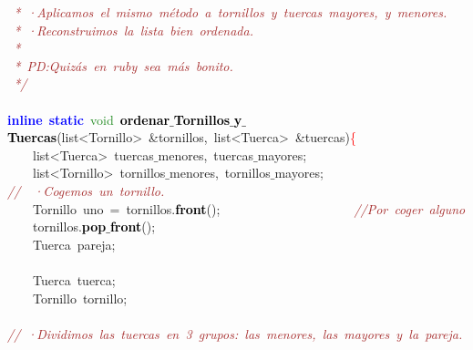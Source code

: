 \mbox{}\textit{\textcolor{Brown}{\ *\ ·Aplicamos\ el\ mismo\ método\ a\ tornillos\ y\ tuercas\ mayores,\ y\ menores.}} \\
\mbox{}\textit{\textcolor{Brown}{\ *\ ·Reconstruimos\ la\ lista\ bien\ ordenada.}} \\
\mbox{}\textit{\textcolor{Brown}{\ *}} \\
\mbox{}\textit{\textcolor{Brown}{\ *\ PD:Quizás\ en\ ruby\ sea\ más\ bonito.}} \\
\mbox{}\textit{\textcolor{Brown}{\ */}} \\
\mbox{} \\
\mbox{}\textbf{\textcolor{Blue}{inline}}\ \textbf{\textcolor{Blue}{static}}\ \textcolor{ForestGreen}{void}\ \textbf{\textcolor{Black}{ordenar$\_$Tornillos$\_$y$\_$Tuercas}}\textcolor{BrickRed}{(}\textcolor{TealBlue}{list\textless{}Tornillo\textgreater{}\ \&tornillos,\ list\textless{}Tuerca\textgreater{}}\ \textcolor{BrickRed}{\&}tuercas\textcolor{BrickRed}{)}\textcolor{Red}{\{} \\
\mbox{}\ \ \ \ \textcolor{TealBlue}{list\textless{}Tuerca\textgreater{}}\ tuercas$\_$menores\textcolor{BrickRed}{,}\ tuercas$\_$mayores\textcolor{BrickRed}{;} \\
\mbox{}\ \ \ \ \textcolor{TealBlue}{list\textless{}Tornillo\textgreater{}}\ tornillos$\_$menores\textcolor{BrickRed}{,}\ tornillos$\_$mayores\textcolor{BrickRed}{;} \\
\mbox{}\textit{\textcolor{Brown}{//\ \ ·Cogemos\ un\ tornillo.}} \\
\mbox{}\ \ \ \ \textcolor{TealBlue}{Tornillo}\ uno\ \textcolor{BrickRed}{=}\ tornillos\textcolor{BrickRed}{.}\textbf{\textcolor{Black}{front}}\textcolor{BrickRed}{();}\ \ \ \ \ \ \ \ \ \ \ \ \ \ \ \ \ \ \ \ \ \textit{\textcolor{Brown}{//Por\ coger\ alguno}} \\
\mbox{}\ \ \ \ tornillos\textcolor{BrickRed}{.}\textbf{\textcolor{Black}{pop$\_$front}}\textcolor{BrickRed}{();} \\
\mbox{}\ \ \ \ \textcolor{TealBlue}{Tuerca}\ pareja\textcolor{BrickRed}{;} \\
\mbox{} \\
\mbox{}\ \ \ \ \textcolor{TealBlue}{Tuerca}\ tuerca\textcolor{BrickRed}{;} \\
\mbox{}\ \ \ \ \textcolor{TealBlue}{Tornillo}\ tornillo\textcolor{BrickRed}{;} \\
\mbox{} \\
\mbox{}\textit{\textcolor{Brown}{//\ ·Dividimos\ las\ tuercas\ en\ 3\ grupos:\ las\ menores,\ las\ mayores\ y\ la\ pareja.}} \\
